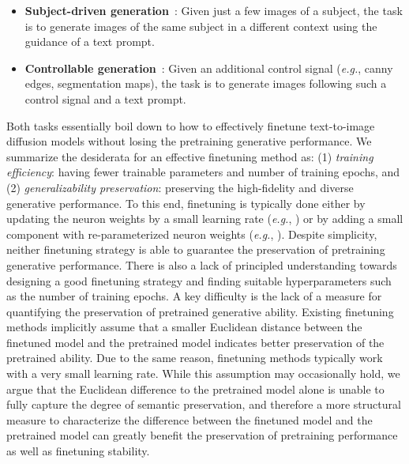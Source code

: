 \documentclass{article}
\newcommand{\eg}{\emph{e.g.}}
\begin{document}
\vspace{0.5mm}
\begin{itemize}[leftmargin=*,nosep]
\setlength\itemsep{0.4em}
    \item \textbf{Subject-driven generation}~\cite{ruiz2023dreambooth}: Given just a few images of a subject, the task is to generate images of the same subject in a different context using the guidance of a text prompt.
    \item \textbf{Controllable generation}~\cite{zhang2023adding,mou2023t2i}: Given an additional control signal (\eg, canny edges, segmentation maps), the task is to generate images following such a control signal and a text prompt.
\end{itemize}
\vspace{0.5mm}

Both tasks essentially boil down to how to effectively finetune text-to-image diffusion models without losing the pretraining generative performance. We summarize the desiderata for an effective finetuning method as: (1) \emph{training efficiency}: having fewer trainable parameters and number of training epochs, and (2) \emph{generalizability preservation}: preserving the high-fidelity and diverse generative performance. To this end, finetuning is typically done either by updating the neuron weights by a small learning rate (\eg, \cite{ruiz2023dreambooth}) or by adding a small component with re-parameterized neuron weights (\eg, \cite{hulora2022,zhang2023adding}). Despite simplicity, neither finetuning strategy is able to guarantee the preservation of pretraining generative performance. There is also a lack of principled understanding towards designing a good finetuning strategy and finding suitable hyperparameters such as the number of training epochs. A key difficulty is the lack of a measure for quantifying the preservation of pretrained generative ability. Existing finetuning methods implicitly assume that a smaller Euclidean distance between the finetuned model and the pretrained model indicates better preservation of the pretrained ability. Due to the same reason, finetuning methods typically work with a very small learning rate. While this assumption may occasionally hold, we argue that the Euclidean difference to the pretrained model alone is unable to fully capture the degree of semantic preservation, and therefore a more structural measure to characterize the difference between the finetuned model and the pretrained model can greatly benefit the preservation of pretraining performance as well as finetuning stability. 
\end{document}
